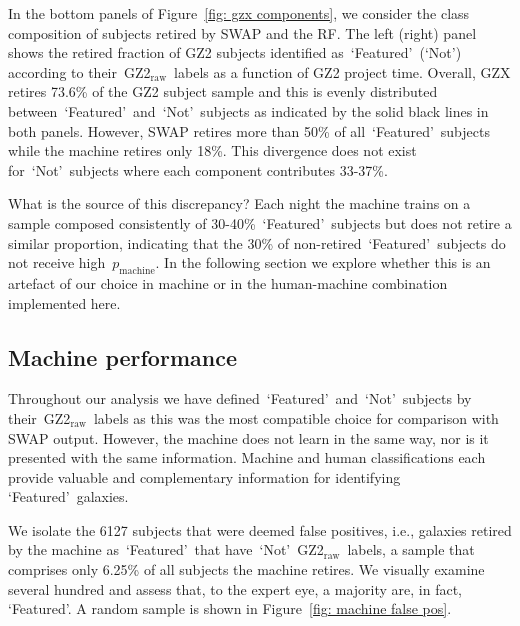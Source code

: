 \documentclass[twocolumn,  trackchanges,]{aastex6}%
\newcommand{\feat}{`Featured'}
\newcommand{\notfeat}{`Not'}
\newcommand{\raw}{GZ2$_{\text{raw}}$}
\newcommand{\pmachine}{$p_{\mathrm{machine}}$}
\begin{document}
In the bottom panels of Figure~\ref{fig: gzx components}, we consider the class
composition of subjects retired by SWAP and the RF. 
The left (right) panel shows the retired fraction of GZ2 subjects identified 
as~\feat~(\notfeat) according to their~\raw~labels as a function of GZ2 project time. 
Overall, GZX retires 73.6\% of the GZ2 subject sample and this is evenly 
distributed between~\feat~and~\notfeat~subjects as indicated by the solid
black lines in both panels. 
However, SWAP retires more than 50\% of all~\feat~subjects while the machine
retires only 18\%. This divergence does not exist for~\notfeat~subjects where
each component contributes 33-37\%. 

What is the source of this discrepancy? 
Each night the machine trains on a sample composed consistently of 30-40\%~\feat~subjects but does not retire a similar proportion, indicating
that the 30\% of non-retired~\feat~subjects do not receive high~\pmachine. 
In the following section we explore whether this is an artefact of our choice in machine 
or in the human-machine combination implemented here. 

\subsection{Machine performance}\label{sec: machine performance}

Throughout our analysis we have defined~\feat~and~\notfeat~subjects by 
their~\raw~labels as this was the most compatible choice for comparison with SWAP output.  
However, the machine does not learn in the same way, nor is it presented with the 
same information. Machine and human classifications 
each provide valuable and complementary information for identifying \feat~galaxies.

We isolate the 6127 subjects that were deemed false positives, i.e., galaxies 
retired by the machine as~\feat~that have~\notfeat~\raw~labels, a sample that
comprises only 6.25\% of all subjects the machine retires.
We visually examine several hundred
and assess that, to the expert eye, a majority are, in fact, \feat.  
A random sample is shown in Figure~\ref{fig: machine false pos}. 
\end{document}
